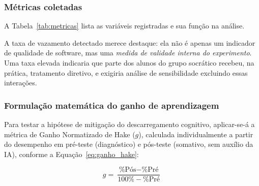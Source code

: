 \documentclass[10pt, a4paper, twocolumn]{article}
\begin{document}
\subsubsection{Métricas coletadas}

A Tabela~\ref{tab:metricas} lista as variáveis registradas e sua função na
análise.

\begin{table}[H]
\centering
\small
\caption{Variáveis coletadas e finalidade}
\label{tab:metricas}
\vspace{0.13cm}
\end{table}

A taxa de vazamento detectado merece destaque: ela não é apenas um indicador de
qualidade de software, mas uma \textit{medida de validade interna do
experimento}. Uma taxa elevada indicaria que parte dos alunos do grupo socrático
recebeu, na prática, tratamento diretivo, e exigiria análise de sensibilidade
excluindo essas interações.

\subsubsection{Formulação matemática do ganho de aprendizagem}

Para testar a hipótese de mitigação do descarregamento cognitivo, aplicar-se-á a
métrica de Ganho Normatizado de Hake ($g$), calculada individualmente a partir do
desempenho em pré-teste (diagnóstico) e pós-teste (somativo, sem auxílio da IA),
conforme a Equação~\ref{eq:ganho_hake}:

\begin{equation}
    g = \frac{\text{\% Pós} - \text{\% Pré}}{100\% - \text{\% Pré}}
    \label{eq:ganho_hake}
\end{equation}
\end{document}

